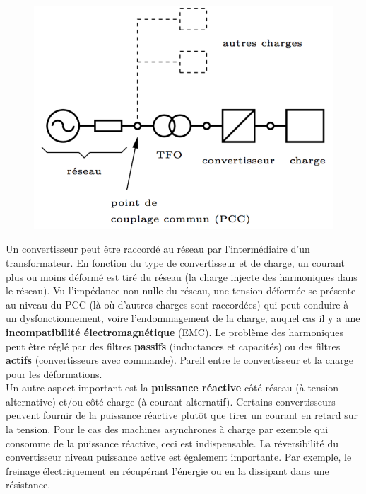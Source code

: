 		\begin{figure}
		\vspace{-5mm}
		\includegraphics[scale=0.25]{ch1/5}
		\end{figure}		
		Un convertisseur peut être raccordé au réseau par l'intermédiaire d'un transformateur. En fonction du type de convertisseur et de charge, un courant plus ou moins déformé est tiré du réseau (la charge injecte des harmoniques dans le réseau). Vu l'impédance non nulle du réseau, une tension déformée se présente au niveau du PCC (là où d'autres charges sont raccordées) qui peut conduire à un dysfonctionnement, voire l'endommagement de la charge, auquel cas il y a une \textbf{incompatibilité électromagnétique} (EMC). Le problème des harmoniques peut être réglé par des filtres \textbf{passifs} (inductances et capacités) ou des filtres \textbf{actifs} (convertisseurs avec commande). Pareil entre le convertisseur et la charge pour les déformations. \\
		
		Un autre aspect important est la \textbf{puissance réactive} côté réseau (à tension alternative) et/ou côté charge (à courant alternatif). Certains convertisseurs peuvent fournir de la puissance réactive plutôt que tirer un courant en retard sur la tension. Pour le cas des machines asynchrones à charge par exemple qui consomme de la puissance réactive, ceci est indispensable. La réversibilité du convertisseur niveau puissance active est également importante. Par exemple, le freinage électriquement en récupérant l'énergie ou en la dissipant dans une résistance. 
		
